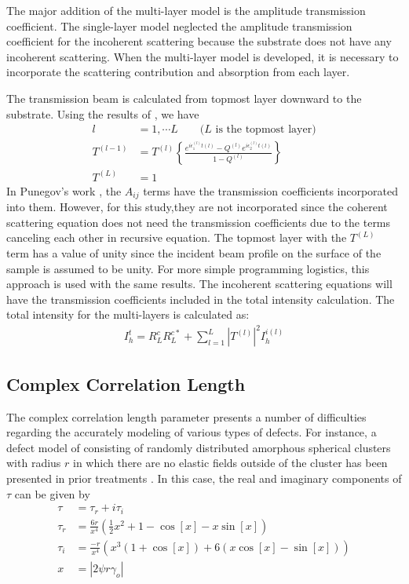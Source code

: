 The major addition of the multi-layer model is the amplitude transmission coefficient.  The single-layer model neglected the amplitude transmission coefficient for the incoherent scattering because the substrate does not have any incoherent scattering.  When the multi-layer model is developed, it is necessary to incorporate the scattering contribution and absorption from each layer.    

The transmission beam is calculated from topmost layer downward to the substrate. Using the results of \cite{Punegov15}, we have
\begin{align}
l &= 1,\cdots L \qquad \text{($L$ is the topmost layer)}\\
T^{(l-1)} &= T^{(l)} \left\{   \frac{e^{i \epsilon^{(l)}_1 t(l)}-Q^{(l)} e^{i \epsilon_2^{(l)} t(l)}}{1-Q^{(l)}}  \right\}\\
T^{(L)} &= 1
\end{align}
In Punegov's work \cite{Punegov15}, the $A_{ij}$ terms have the transmission coefficients incorporated into them.  However, for this study,they are not incorporated since the coherent scattering equation does not need the transmission coefficients due to the terms canceling each other in recursive equation. The topmost layer with the $T^{(L)}$ term has a value of unity since the incident beam profile on the surface of the sample is assumed to be unity.  For more simple programming logistics, this approach is used with the same results.  The incoherent scattering equations will have the transmission coefficients included in the total intensity calculation.  The total intensity for the multi-layers is calculated as:
\begin{align}
I^t_h = R_L^c R_L^{c*} + \sum_{l=1}^L{|T^{(l)}|^2 I^{i(l)}_h}
\end{align}

		\subsection{Complex Correlation Length}

The complex correlation length parameter presents a number of difficulties regarding the accurately modeling of various types of defects. For instance, a defect model of consisting of randomly distributed amorphous spherical clusters with radius $r$ in which there are no elastic fields outside of the cluster has been presented in prior treatments \cite{Bushuev1}. In this case, the real and imaginary components of $\tau$ can be given by \cite{Bushuev1}
\begin{align}
\tau &= \tau_r + i \tau_i\\
\tau_r &= \frac{6 r}{x^4} (\frac{1}{2} x^2 +1-\cos[x] - x \sin [x])\\
\tau_i &= \frac{-r}{x^4}(x^3 (1+\cos [x]) +6(x \cos [x] - \sin[x]))\\
x &= |2 \psi r \gamma_o|
\end{align}


